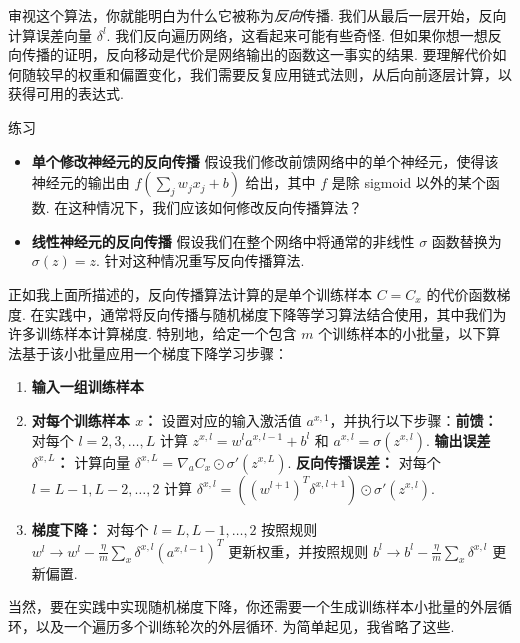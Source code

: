 审视这个算法，你就能明白为什么它被称为\emph{反向}传播. 我们从最后一层开始，反向计算误差向量 $\delta^l$. 我们反向遍历网络，这看起来可能有些奇怪. 但如果你想一想反向传播的证明，反向移动是代价是网络输出的函数这一事实的结果. 要理解代价如何随较早的权重和偏置变化，我们需要反复应用链式法则，从后向前逐层计算，以获得可用的表达式.

\begin{exerciseBox}{练习}

\begin{itemize}

\item \textbf{单个修改神经元的反向传播} 假设我们修改前馈网络中的单个神经元，使得该神经元的输出由 $f(\sum_j w_j x_j + b)$ 给出，其中 $f$ 是除 sigmoid 以外的某个函数. 在这种情况下，我们应该如何修改反向传播算法？

\item \textbf{线性神经元的反向传播} 假设我们在整个网络中将通常的非线性 $\sigma$ 函数替换为 $\sigma(z) = z$. 针对这种情况重写反向传播算法.

\end{itemize}

正如我上面所描述的，反向传播算法计算的是单个训练样本 $C = C_x$ 的代价函数梯度. 在实践中，通常将反向传播与随机梯度下降等学习算法结合使用，其中我们为许多训练样本计算梯度. 特别地，给定一个包含 $m$ 个训练样本的小批量，以下算法基于该小批量应用一个梯度下降学习步骤：

\begin{enumerate}

\item \textbf{输入一组训练样本}

\item \textbf{对每个训练样本 $x$：} 设置对应的输入激活值 $a^{x,1}$，并执行以下步骤：\textbf{前馈：} 对每个 $l = 2, 3, \ldots, L$ 计算 $z^{x,l} = w^l a^{x,l-1}+b^l$ 和 $a^{x,l} = \sigma(z^{x,l})$. \textbf{输出误差 $\delta^{x,L}$：} 计算向量 $\delta^{x,L} = \nabla_a C_x \odot \sigma'(z^{x,L})$. \textbf{反向传播误差：} 对每个 $l = L-1, L-2, \ldots, 2$ 计算 $\delta^{x,l} = ((w^{l+1})^T \delta^{x,l+1}) \odot \sigma'(z^{x,l})$.

\item \textbf{梯度下降：} 对每个 $l = L, L-1, \ldots, 2$ 按照规则 $w^l \rightarrow w^l-\frac{\eta}{m} \sum_x \delta^{x,l} (a^{x,l-1})^T$ 更新权重，并按照规则 $b^l \rightarrow b^l-\frac{\eta}{m} \sum_x \delta^{x,l}$ 更新偏置.

\end{enumerate}

当然，要在实践中实现随机梯度下降，你还需要一个生成训练样本小批量的外层循环，以及一个遍历多个训练轮次的外层循环. 为简单起见，我省略了这些.

\end{exerciseBox}

